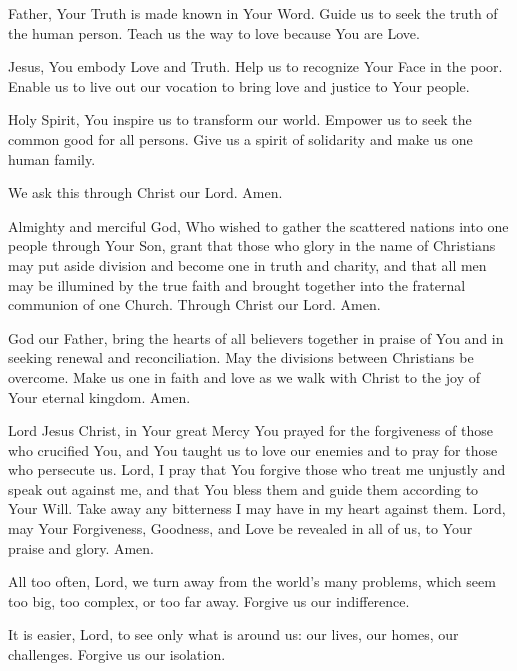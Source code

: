 \label{prayer:charity_truth}
Father, Your Truth is made known in Your Word.
Guide us to seek the truth of the human person.
Teach us the way to love because You are Love.

Jesus, You embody Love and Truth.
Help us to recognize Your Face in the poor.
Enable us to live out our vocation to bring love and justice to Your people.

Holy Spirit, You inspire us to transform our world.
Empower us to seek the common good for all persons.
Give us a spirit of solidarity and make us one human family.

We ask this through Christ our Lord. Amen.

Almighty and merciful God, Who wished to gather the scattered nations into one people
through Your Son, grant that those who glory in the name of Christians may put aside
division and become one in truth and charity, and that all men may be illumined by the
true faith and brought together into the fraternal communion of one Church.
Through Christ our Lord. Amen.

God our Father, bring the hearts of all believers together in praise of You and in seeking renewal and reconciliation.
May the divisions between Christians be overcome.
Make us one in faith and love as we walk with Christ to the joy of Your eternal kingdom.
Amen.

Lord Jesus Christ, in Your great Mercy You prayed for the forgiveness of those who crucified You, and You taught us to love our enemies and to pray for those who persecute us.
Lord, I pray that You forgive those who treat me unjustly and speak out against me, and that You bless them and guide them according to Your Will.
Take away any bitterness I may have in my heart against them.
Lord, may Your Forgiveness, Goodness, and Love be revealed in all of us, to Your praise and glory.
Amen.

\label{prayer:indifference}
All too often, Lord, we turn away from the world's many problems, which seem too big, too complex, or too far away.
Forgive us our indifference.

It is easier, Lord, to see only what is around us:
our lives, our homes, our challenges.
Forgive us our isolation.

